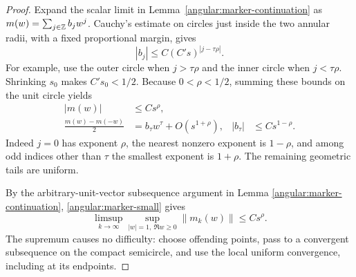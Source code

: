 \begin{proof}
Expand the scalar limit in Lemma~\ref{angular:marker-continuation} as
$m(w)=\sum_{j\in\mathbb Z}b_jw^j$.  Cauchy's estimate on circles just inside
the two annular radii, with a fixed proportional margin, gives
\begin{equation}\label{angular:laurent-coefficients}
 |b_j|\le C(C's)^{|j-\tau\rho|}.
\end{equation}
For example, use the outer circle when $j>\tau\rho$ and the inner
circle when $j<\tau\rho$.  Shrinking $s_0$ makes $C's_0<1/2$.
Because $0<\rho<1/2$, summing these bounds on the unit circle yields
\begin{align}
 |m(w)|&\le Cs^\rho,\label{angular:marker-small}\\
 \frac{m(w)-m(-w)}2
 &=b_\tau w^\tau+O(s^{1+\rho}),
 &|b_\tau|&\le Cs^{1-\rho}.
 \label{angular:odd-mode}
\end{align}
Indeed $j=0$ has exponent $\rho$, the nearest nonzero exponent is
$1-\rho$, and among odd indices other than $\tau$ the smallest
exponent is $1+\rho$.  The remaining geometric tails are uniform.

By the arbitrary-unit-vector subsequence argument in Lemma
\ref{angular:marker-continuation}, \eqref{angular:marker-small} gives
\begin{equation}\label{angular:compressed-marker-small}
 \limsup_{k\to\infty}
 \sup_{|w|=1,\ \Re w\ge0}\|m_k(w)\|\le Cs^\rho.
\end{equation}
The supremum causes no difficulty: choose offending points, pass to
a convergent subsequence on the compact semicircle, and use the
local uniform convergence, including at its endpoints.


\end{proof}
